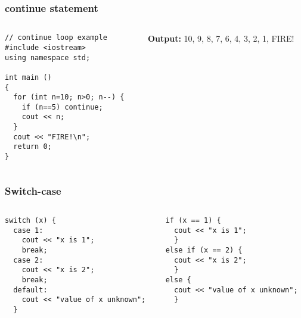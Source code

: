 \documentclass{beamer}
\newtheorem{Key points}{Key points}
\newcommand\Fontviaa{\fontsize{8}{7.2}\selectfont}
\begin{document}
\begin{frame}[fragile]
\frametitle{continue statement}
\begin{columns}[onlytextwidth]
    \begin{column}{0.6\textwidth}
      \centering
\Fontviaa
\begin{lstlisting}
// continue loop example
#include <iostream>
using namespace std;

int main ()
{
  for (int n=10; n>0; n--) {
    if (n==5) continue;
    cout << n;
  }
  cout << "FIRE!\n";
  return 0;
}
\end{lstlisting}
    \end{column}
\pause    \begin{column}{0.4\textwidth}
      \centering
\textbf{{\color{blue}Output:}} 10, 9, 8, 7, 6, 4, 3, 2, 1, FIRE!
    \end{column}
\end{columns}
\end{frame}
\begin{frame}[fragile]
\frametitle{Switch-case}
\begin{columns}[onlytextwidth]
    \begin{column}{0.5\textwidth}
      \centering
\Fontviaa
\begin{lstlisting}
switch (x) {
  case 1:
    cout << "x is 1";
    break;
  case 2:
    cout << "x is 2";
    break;
  default:
    cout << "value of x unknown";
  }
\end{lstlisting}
    \end{column}
    \begin{column}{0.4\textwidth}
      \centering
\Fontviaa
\begin{lstlisting}
if (x == 1) {
  cout << "x is 1";
  }
else if (x == 2) {
  cout << "x is 2";
  }
else {
  cout << "value of x unknown";
  }
\end{lstlisting}
    \end{column}
\end{columns}
\end{frame}
\end{document}
